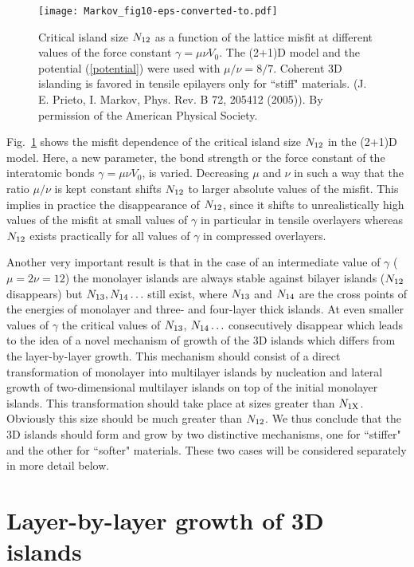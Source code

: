 \documentclass[aps,prl,showpacs,twocolumn,byrevtex,floatfix]{revtex4-1}
\begin{document}
\begin{figure}[htb]
\texttt{[image: Markov\_fig10-eps-converted-to.pdf]}
\caption{\label{en123D} Critical island size $N_{\rm 12}$ as a function of the
lattice misfit at different values of the force constant $\gamma = \mu \nu
V_0$. The (2+1)D model and the potential (\ref{potential}) were used 
with $\mu /\nu = 8/7$. Coherent 3D islanding is favored in tensile epilayers 
only for ``stiff" materials. (J. E. Prieto, I. Markov, Phys. Rev. B 72, 
205412 (2005)). By permission of the American Physical Society.}
\end{figure}


Fig.\ \ref{en123D} shows the misfit dependence of the critical island size
$N_{\rm 12}$ in the (2+1)D model.\cite{Prieto05} Here, a new parameter, the bond
strength or the force constant of the interatomic bonds $\gamma = \mu \nu V_0$,
is varied. Decreasing $\mu$ and $\nu$ in such a way that the ratio $\mu /\nu$ is
kept constant shifts $N_{\rm 12}$ to larger absolute values of the misfit. This
implies in practice the disappearance of $N_{\rm 12}$, since it shifts to
unrealistically high values of the misfit at small values of $\gamma$ in
particular in tensile overlayers whereas $N_{\rm 12}$ exists practically
for all values of $\gamma$ in compressed overlayers.

Another very important result is that in the case of an intermediate value of
$\gamma$ ($\mu = 2\nu = 12$) the monolayer islands are always stable against
bilayer islands ($N_{\rm 12}$ disappears) but $N_{\rm 13}, N_{\rm 14}\hdots$
still exist, where $N_{\rm 13}$ and $N_{\rm 14}$ are the cross points of
the energies of monolayer and three- and four-layer thick islands. At even
smaller values of $\gamma$ the critical values
of $N_{\rm 13}$, $N_{\rm 14}\hdots$ consecutively disappear which leads to the
idea of a novel mechanism of growth of the 3D islands which differs from the
layer-by-layer growth. This mechanism should consist of a direct
transformation of monolayer into multilayer islands by nucleation and lateral
growth of two-dimensional multilayer islands on top of the initial monolayer
islands. This transformation should take place at sizes greater than $N_{\rm
1X}$. Obviously this size should be much greater than $N_{\rm 12}$. We thus
conclude that the 3D islands should form and grow by two distinctive mechanisms,
one for ``stiffer" and the other for ``softer" materials. These two cases 
will be considered separately in more detail below.

\section{Layer-by-layer growth of 3D islands}
\end{document}
